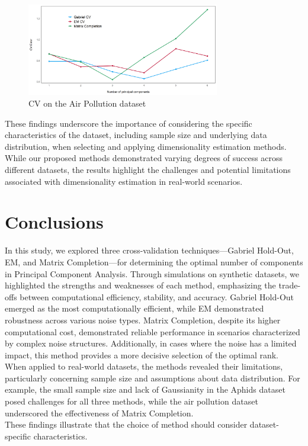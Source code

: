 \documentclass{article}
\begin{document}
\begin{figure}[h!]
    \centering
    \includegraphics[width=0.75\textwidth]{pollution.png}
    \caption{CV on the Air Pollution dataset}
    \label{fig:pollution}
\end{figure}
These findings underscore the importance of considering the specific characteristics of the dataset, 
including sample size and underlying data distribution, when selecting and applying dimensionality estimation 
methods. While our proposed methods demonstrated varying degrees of success across different datasets, the 
results highlight the challenges and potential limitations associated with dimensionality estimation in 
real-world scenarios.

\section{Conclusions}
In this study, we explored three cross-validation techniques—Gabriel Hold-Out, EM, 
and Matrix Completion—for determining the optimal number of components in Principal Component Analysis. 
Through simulations on synthetic datasets, we highlighted the strengths and weaknesses of each method, 
emphasizing the trade-offs between computational efficiency, stability, and accuracy. Gabriel Hold-Out 
emerged as the most computationally efficient, while EM demonstrated robustness across various noise types. 
Matrix Completion, despite its higher computational cost, demonstrated reliable performance in scenarios characterized
 by complex noise structures. Additionally, in cases where the noise has a limited impact, this method provides a more 
 decisive selection of the optimal rank.\\
When applied to real-world datasets, the methods revealed their limitations, particularly concerning sample size 
and assumptions about data distribution. For example, the small sample size and lack of Gaussianity in the Aphids 
dataset posed challenges for all three methods, while the air pollution dataset underscored the effectiveness of Matrix Completion.\\
These findings illustrate that the choice of method should consider dataset-specific characteristics. 
\end{document}
